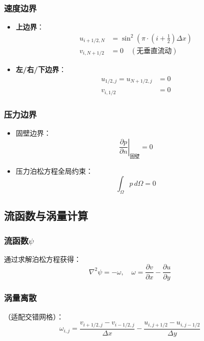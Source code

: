 \documentclass[UTF8]{ctexart}
\begin{document}
\subsubsection{速度边界}
\begin{itemize}
    \item \textbf{上边界}：
    \begin{align}
    u_{i+1/2,N} &= \sin^2\left(\pi \cdot \left(i+\frac{1}{2}\right)\Delta x\right) \\
    v_{i,N+1/2} &= 0 \quad (\text{无垂直流动})
    \end{align}
    
    \item \textbf{左/右/下边界}：
    \begin{align}
    u_{1/2,j} = u_{N+1/2,j} &= 0 \\
    v_{i,1/2} &= 0
    \end{align}
\end{itemize}

\subsubsection{压力边界}
\begin{itemize}
    \item 固壁边界：
    \begin{equation}
    \left.\frac{\partial p}{\partial n}\right|_{\text{固壁}} = 0
    \end{equation}
    
    \item 压力泊松方程全局约束：
    \begin{equation}
    \int_{\Omega} p \, d\Omega = 0
    \end{equation}
\end{itemize}

\subsection{流函数与涡量计算}
\subsubsection{流函数$\psi$}
通过求解泊松方程获得：
\begin{equation}
\nabla^2 \psi = -\omega, \quad \omega = \frac{\partial v}{\partial x} - \frac{\partial u}{\partial y}
\label{eq:streamfunction}
\end{equation}

\subsubsection{涡量离散}（适配交错网格）：
\begin{equation}
\omega_{i,j} = \frac{v_{i+1/2,j} - v_{i-1/2,j}}{\Delta x} - \frac{u_{i,j+1/2} - u_{i,j-1/2}}{\Delta y}
\label{eq:vorticity}
\end{equation}
\end{document}
